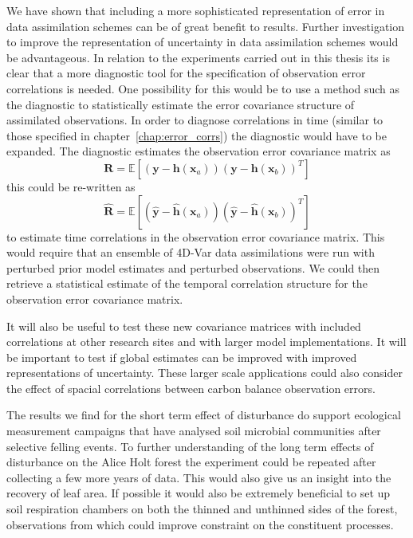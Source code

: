 We have shown that including a more sophisticated representation of error in data assimilation schemes can be of great benefit to results. Further investigation to improve the representation of uncertainty in data assimilation schemes would be advantageous. In relation to the experiments carried out in this thesis its is clear that a more diagnostic tool for the specification of observation error correlations is needed. One possibility for this would be to use a method such as the \citet{desroziers2005diagnosis} diagnostic to statistically estimate the error covariance structure of assimilated observations. In order to diagnose correlations in time (similar to those specified in chapter~\ref{chap:error_corrs}) the \citet{desroziers2005diagnosis} diagnostic would have to be expanded. The \citet{desroziers2005diagnosis} diagnostic estimates the observation error covariance matrix as
\begin{equation}
\textbf{R} = \mathbb{E}[(\textbf{y}-\textbf{h}(\textbf{x}_a))(\textbf{y}-\textbf{h}(\textbf{x}_b))^{T}]
\end{equation}
this could be re-written as
\begin{equation}
\hat{\textbf{R}} = \mathbb{E}[(\hat{\textbf{y}}-\hat{\textbf{h}}(\textbf{x}_a))(\hat{\textbf{y}}-\hat{\textbf{h}}(\textbf{x}_b))^{T}]
\end{equation}
to estimate time correlations in the observation error covariance matrix. This would require that an ensemble of 4D-Var data assimilations were run with perturbed prior model estimates and perturbed observations. We could then retrieve a statistical estimate of the temporal correlation structure for the observation error covariance matrix. 

It will also be useful to test these new covariance matrices with included correlations at other research sites and with larger model implementations. It will be important to test if global estimates can be improved with improved representations of uncertainty. These larger scale applications could also consider the effect of spacial correlations between carbon balance observation errors.

The results we find for the short term effect of disturbance do support ecological measurement campaigns that have analysed soil microbial communities after selective felling events. To further understanding of the long term effects of disturbance on the Alice Holt forest the experiment could be repeated after collecting a few more years of data. This would also give us an insight into the recovery of leaf area. If possible it would also be extremely beneficial to set up soil respiration chambers on both the thinned and unthinned sides of the forest, observations from which could improve constraint on the constituent processes.

